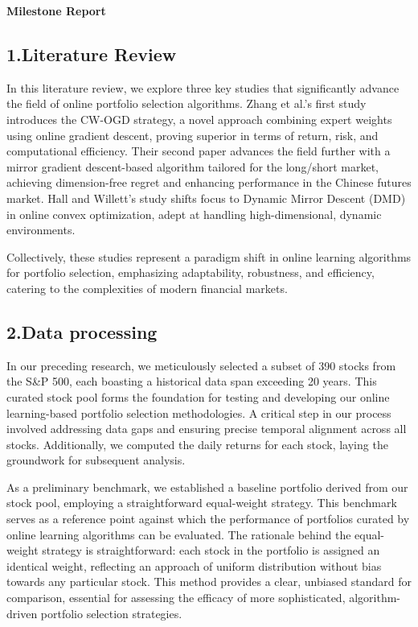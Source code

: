 \documentclass[]{report}
\begin{document}
\begin{center}
    \Large \textbf{Milestone Report}
\end{center}

\subsection*{1.Literature Review}


In this literature review, we explore three key studies that significantly advance the field of online portfolio selection algorithms. Zhang et al.\cite*{zhang2021combining}'s first study introduces the CW-OGD strategy, a novel approach combining expert weights using online gradient descent, proving superior in terms of return, risk, and computational efficiency. Their second paper\cite*{zhang2023effective} advances the field further with a mirror gradient descent-based algorithm tailored for the long/short market, achieving dimension-free regret and enhancing performance in the Chinese futures market. Hall and Willett's\cite*{hall2015online} study shifts focus to Dynamic Mirror Descent (DMD) in online convex optimization, adept at handling high-dimensional, dynamic environments. 

Collectively, these studies represent a paradigm shift in online learning algorithms for portfolio selection, emphasizing adaptability, robustness, and efficiency, catering to the complexities of modern financial markets.

\subsection*{2.Data processing}
In our preceding research, we meticulously selected a subset of 390 stocks from the S\&P 500, each boasting a historical data span exceeding 20 years. This curated stock pool forms the foundation for testing and developing our online learning-based portfolio selection methodologies. A critical step in our process involved addressing data gaps and ensuring precise temporal alignment across all stocks. Additionally, we computed the daily returns for each stock, laying the groundwork for subsequent analysis.

As a preliminary benchmark, we established a baseline portfolio derived from our stock pool, employing a straightforward equal-weight strategy. This benchmark serves as a reference point against which the performance of portfolios curated by online learning algorithms can be evaluated. The rationale behind the equal-weight strategy is straightforward: each stock in the portfolio is assigned an identical weight, reflecting an approach of uniform distribution without bias towards any particular stock. This method provides a clear, unbiased standard for comparison, essential for assessing the efficacy of more sophisticated, algorithm-driven portfolio selection strategies.
\end{document}
